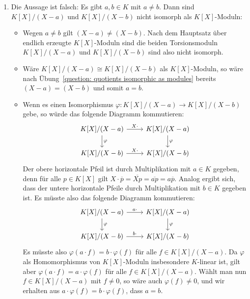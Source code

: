 \begin{solution}
\begin{enumerate}
    \item
      Die Aussage ist falsch:
      Es gibt $a, b \in K$ mit $a \neq b$.
      Dann sind $K[X]/(X-a)$ und $K[X]/(X-b)$ nicht isomorph als $K[X]$-Moduln:
      \begin{itemize}
        \item
          Wegen $a \neq b$ gilt $(X-a) \neq (X-b)$.
          Nach dem Hauptsatz über endlich erzeugte $K[X]$-Moduln sind die beiden Torsionsmoduln $K[X]/(X-a)$ und $K[X]/(X-b)$ sind also nicht isomorph.
        \item
          Wäre $K[X]/(X-a) \cong K[X]/(X-b)$ als $K[X]$-Moduln, so wäre nach Übung~\ref{question: quotients isomorphic as modules} bereits $(X-a) = (X-b)$ und somit $a = b$.
        \item
          Wenn es einen Isomorphismus $\varphi \colon K[X]/(X-a) \to K[X]/(X-b)$ gebe, so würde das folgende Diagramm kommutieren:
          \[
            \begin{tikzcd}[ampersand replacement = \&]
                  K[X]/(X-a)
                  \arrow{r}{X \cdot}
                  \arrow{d}{\varphi}
              \&  K[X]/(X-a)
                  \arrow{d}{\varphi}
              \\
                  K[X]/(X-b)
                  \arrow{r}{X \cdot}
              \&  K[X]/(X-b)
            \end{tikzcd}
          \]
          Der obere horizontale Pfeil ist durch Multiplikation mit $a \in K$ gegeben, denn für alle $p \in K[X]$ gilt $X \cdot \overline{p} = \overline{Xp} = \overline{ap} = a \overline{p}$.
          Analog ergibt sich, dass der untere horizontale Pfeile durch Multiplikation mit $b \in K$ gegeben ist.
          Es müsste also das folgende Diagramm kommutieren:
          \[
            \begin{tikzcd}[ampersand replacement = \&]
                  K[X]/(X-a)
                  \arrow{r}{a \cdot}
                  \arrow{d}{\varphi}
              \&  K[X]/(X-a)
                  \arrow{d}{\varphi}
              \\
                  K[X]/(X-b)
                  \arrow{r}{b \cdot}
              \&  K[X]/(X-b)
            \end{tikzcd}
          \]
          Es müsste also $\varphi(a \cdot f) = b \cdot \varphi(f)$ für alle $f \in K[X]/(X-a)$.
          Da $\varphi$ als Homomorphismus von $K[X]$-Moduln insbesondere $K$-linear ist, gilt aber $\varphi(a \cdot f) = a \cdot \varphi(f)$ für alle $f \in K[X]/(X-a)$.
          Wählt man nun $f \in K[X]/(X-a)$ mit $f \neq 0$, so wäre auch $\varphi(f) \neq 0$, und wir erhalten aus $a \cdot \varphi(f) = b \cdot \varphi(f)$, dass $a = b$.
      \end{itemize}
      

\end{enumerate}
\end{solution}
